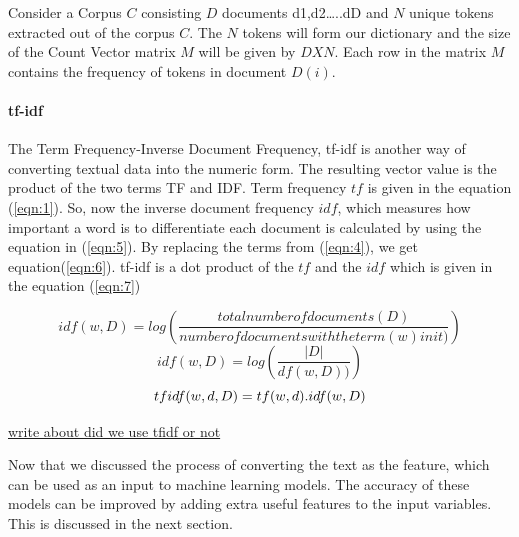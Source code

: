 Consider a Corpus $C$ consisting $D$ documents {d1,d2…..dD} and $N$ unique tokens extracted out of the corpus $C$. The $N$ tokens will form our dictionary and the size of the Count Vector matrix $M$ will be given by $D X N$. Each row in the matrix $M$ contains the frequency of tokens in document $D(i)$.

\paragraph{tf-idf}
The Term Frequency-Inverse Document Frequency, tf-idf is another way of converting textual data into the numeric form. The resulting vector value is the product of the two terms TF and IDF. Term frequency $tf$ is given in the equation (\ref{eqn:1}). So, now the inverse document frequency $idf$, which measures how important a word is to differentiate each document is calculated by using the equation in (\ref{eqn:5}). By replacing the terms from (\ref{eqn:4}), we get equation(\ref{eqn:6}). tf-idf is a dot product of the $tf$ and the $idf$ which is given in the equation (\ref{eqn:7})

\begin{equation}
\label{eqn:5}
idf(w,D) = log (\frac{total number of documents(D)}{number of documents with the term(w) in it)})
\end{equation}
\begin{equation}
\label{eqn:6}
idf(w,D) = log (\frac{|D|}{df(w,D))})
\end{equation}
\begin{equation}
\label{eqn:7}
tf\-idf(w,d,D) = tf(w,d) . idf(w,D)
\end{equation}


\underline{write about  did we use tfidf or not}

Now that we discussed the process of converting the text as the feature, which can be used as an input to machine learning models. The accuracy of these models can be improved by adding extra useful features to the input variables. This is discussed in the next section.


